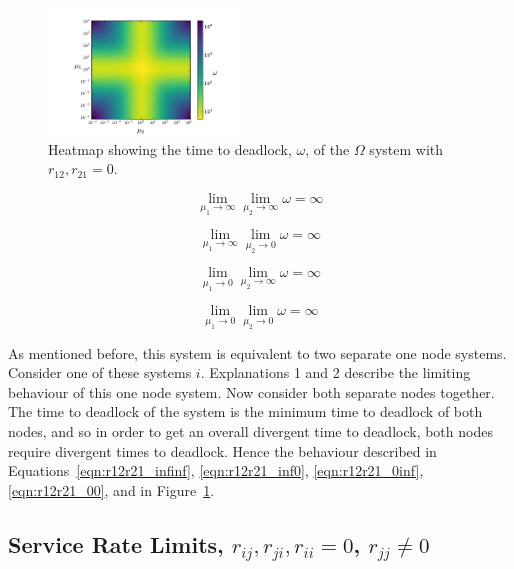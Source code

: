 \documentclass{article}
\begin{document}
\begin{figure}[htbp!]
	\begin{center}
		\includegraphics[width=0.45\textwidth]{images/r11r22.pdf}
	\end{center}
	\caption{Heatmap showing the time to deadlock, $\omega$, of the $\Omega$ system with $r_{12}, r_{21} = 0$.}
	\label{fig:r11r22}
\end{figure}

\begin{equation}\label{eqn:r12r21_infinf}
\lim_{\mu_1 \to \infty} \lim_{\mu_2 \to \infty} \omega = \infty
\end{equation}

\begin{equation}\label{eqn:r12r21_inf0}
\lim_{\mu_1 \to \infty} \lim_{\mu_2 \to 0} \omega = \infty
\end{equation}

\begin{equation}\label{eqn:r12r21_0inf}
\lim_{\mu_1 \to 0} \lim_{\mu_2 \to \infty} \omega = \infty
\end{equation}

\begin{equation}\label{eqn:r12r21_00}
\lim_{\mu_1 \to 0} \lim_{\mu_2 \to 0} \omega = \infty
\end{equation}

As mentioned before, this system is equivalent to two separate one node systems. Consider one of these systems $i$. Explanations 1 and 2 describe the limiting behaviour of this one node system. Now consider both separate nodes together. The time to deadlock of the system is the minimum time to deadlock of both nodes, and so in order to get an overall divergent time to deadlock, both nodes require divergent times to deadlock. Hence the behaviour described in Equations~\ref{eqn:r12r21_infinf}, \ref{eqn:r12r21_inf0}, \ref{eqn:r12r21_0inf}, \ref{eqn:r12r21_00}, and in Figure~\ref{fig:r11r22}.



\subsection{Service Rate Limits, $r_{ij}, r_{ji}, r_{ii} = 0$, $r_{jj} \neq 0$}\label{sec:rjj}
\end{document}
